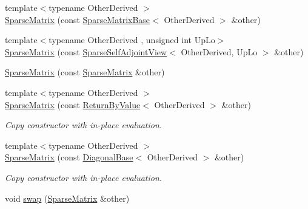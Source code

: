 \begin{DoxyCompactItemize}
\item 
{\footnotesize template$<$typename Other\+Derived $>$ }\\\mbox{\hyperlink{class_eigen_1_1_sparse_matrix_a501a50f0d7d58dc4c1d990cd912f581f}{Sparse\+Matrix}} (const \mbox{\hyperlink{class_eigen_1_1_sparse_matrix_base}{Sparse\+Matrix\+Base}}$<$ Other\+Derived $>$ \&other)
\item 
{\footnotesize template$<$typename Other\+Derived , unsigned int Up\+Lo$>$ }\\\mbox{\hyperlink{class_eigen_1_1_sparse_matrix_aa755e8ba4ec4a2e39ebdb658228364e5}{Sparse\+Matrix}} (const \mbox{\hyperlink{class_eigen_1_1_sparse_self_adjoint_view}{Sparse\+Self\+Adjoint\+View}}$<$ Other\+Derived, Up\+Lo $>$ \&other)
\item 
\mbox{\hyperlink{class_eigen_1_1_sparse_matrix_af0fa64cdba1f30353aac937a31db33f3}{Sparse\+Matrix}} (const \mbox{\hyperlink{class_eigen_1_1_sparse_matrix}{Sparse\+Matrix}} \&other)
\item 
\mbox{\label{class_eigen_1_1_sparse_matrix_a4e328e4686980219c2b4d2a932670ab0}} 
{\footnotesize template$<$typename Other\+Derived $>$ }\\\mbox{\hyperlink{class_eigen_1_1_sparse_matrix_a4e328e4686980219c2b4d2a932670ab0}{Sparse\+Matrix}} (const \mbox{\hyperlink{class_eigen_1_1_return_by_value}{Return\+By\+Value}}$<$ Other\+Derived $>$ \&other)
\begin{DoxyCompactList}\small\item\em Copy constructor with in-\/place evaluation. \end{DoxyCompactList}\item 
\mbox{\label{class_eigen_1_1_sparse_matrix_a1c6fde42fd40e6f753b60f71e8fd88aa}} 
{\footnotesize template$<$typename Other\+Derived $>$ }\\\mbox{\hyperlink{class_eigen_1_1_sparse_matrix_a1c6fde42fd40e6f753b60f71e8fd88aa}{Sparse\+Matrix}} (const \mbox{\hyperlink{class_eigen_1_1_diagonal_base}{Diagonal\+Base}}$<$ Other\+Derived $>$ \&other)
\begin{DoxyCompactList}\small\item\em Copy constructor with in-\/place evaluation. \end{DoxyCompactList}\item 
void \mbox{\hyperlink{class_eigen_1_1_sparse_matrix_ae9b9ad3524f87276511397d988b7a607}{swap}} (\mbox{\hyperlink{class_eigen_1_1_sparse_matrix}{Sparse\+Matrix}} \&other)

\end{DoxyCompactItemize}
